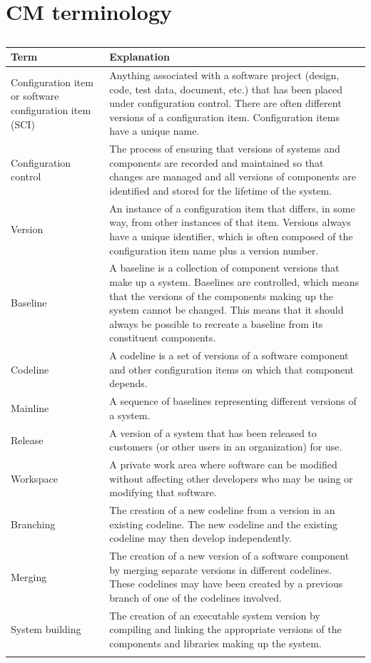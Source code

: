 \newpage
\section{CM terminology}
\begin{longtable}{|p{2cm}|p{10cm}|}
\hline
Term & Explanation \\
\hline
\hline
Configuration item or software configuration item (SCI) & Anything associated with a software project (design, code, test data, document, etc.) that has been placed under configuration control. There are often different versions of a configuration item. Configuration items have a unique name.\\
\hline
Configuration control & The process of ensuring that versions of systems and components are recorded and maintained so that changes are managed and all versions of components are identified and stored for the lifetime of the system.\\
\hline
Version & An instance of a configuration item that differs, in some way, from other instances of that item. Versions always have a unique identifier, which is often composed of the configuration item name plus a version number.\\
\hline
Baseline & A baseline is a collection of component versions that make up a system. Baselines are controlled, which means that the versions of the components making up the system cannot be changed. This means that it should always be possible to recreate a baseline from its constituent components.\\
\hline
Codeline & A codeline is a set of versions of a software component and other configuration items on which that component depends.\\
\hline
Mainline & A sequence of baselines representing different versions of a system.\\
\hline
Release & A version of a system that has been released to customers (or other users in an organization) for use.\\
\hline
Workspace & A private work area where software can be modified without affecting other developers who may be using or modifying that software.\\
\hline
Branching & The creation of a new codeline from a version in an existing codeline. The new codeline and the existing codeline may then develop independently.\\
\hline
Merging & The creation of a new version of a software component by merging separate versions in different codelines. These codelines may have been created by a previous branch of one of the codelines involved.\\
\hline
System building & The creation of an executable system version by compiling and linking the appropriate versions of the components and libraries making up the system.\\
\hline
\caption{}
\label{table:T6_2}
\end{longtable}


